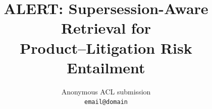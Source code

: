 
\title{ALERT: Supersession-Aware Retrieval for\\Product--Litigation Risk Entailment}

\author{
  Anonymous ACL submission \\
  \texttt{email@domain} \\
}

